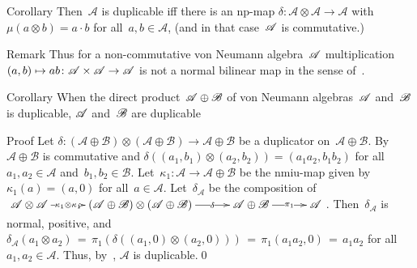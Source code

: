 \documentclass[a]{subfiles}
\begin{document}
\begin{parsec}
\begin{point}{Corollary}
Then~$\mathscr{A}$
is duplicable
iff there is
an np-map $\delta\colon\mathscr{A}\otimes\mathscr{A}
\to \mathscr{A}$
with $\mu(a\otimes b)=a\cdot b$ 
for all~$a,b\in\mathscr{A}$,
(and in that case~$\mathscr{A}$ is commutative.)
\begin{point}{Remark}%
Thus
for a non-commutative von Neumann algebra~$\mathscr{A}$ 
multiplication $(a,b)\mapsto ab\colon \mathscr{A}\times \mathscr{A}\to\mathscr{A}$
is not a normal bilinear map
in the sense of~.
\end{point}
\end{point}
\begin{point}{Corollary}%
When the direct product~$\mathscr{A}\oplus\mathscr{B}$
of von Neumann algebras~$\mathscr{A}$ and~$\mathscr{B}$
is duplicable,
$\mathscr{A}$ and~$\mathscr{B}$ are duplicable
\begin{point}{Proof}%
Let $\delta\colon (\mathscr{A}\oplus\mathscr{B})\otimes
(\mathscr{A}\oplus\mathscr{B})\longrightarrow
\mathscr{A}\oplus\mathscr{B}$
be a duplicator on~$\mathscr{A}\oplus\mathscr{B}$.
By~
$\mathscr{A}\oplus\mathscr{B}$
is commutative
and $\delta((a_1,b_1)\otimes (a_2,b_2))
= (a_1a_2,b_1b_2)$
for all $a_1,a_2\in\mathscr{A}$
and~$b_1,b_2\in\mathscr{B}$.
Let~$\kappa_1\colon \mathscr{A}\to\mathscr{A}\oplus\mathscr{B}$
be the nmiu-map
given by~$\kappa_1(a)=(a,0)$ for all~$a\in\mathscr{A}$.
Let~$\delta_\mathscr{A}$ be the composition of
$\xymatrix@C=3em{
\mathscr{A}\otimes\mathscr{A}
\ar[r]|-{\kappa_1\otimes\kappa_1}
&
(\mathscr{A}\oplus\mathscr{B})
\otimes
(\mathscr{A}\oplus\mathscr{B})
\ar[r]|-{\delta}
&
\mathscr{A}\oplus\mathscr{B}
\ar[r]|-{\pi_1}
&
\mathscr{A}
}$.
Then~$\delta_\mathscr{A}$ is normal, positive,
and
$\delta_\mathscr{A}(a_1\otimes a_2)
\,=\,  \pi_1(\delta((a_1,0)\otimes (a_2,0))) 
\,=\, \pi_1(a_1a_2,0)\,=\,a_1a_2$
for all~$a_1,a_2\in\mathscr{A}$.
Thus, by~,
$\mathscr{A}$
is duplicable.\qed
\end{point}
\end{point}
\end{parsec}
\end{document}
